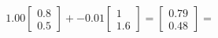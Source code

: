 \documentclass[preview]{standalone}
\begin{document}
\begin{align*}
1.00 \begin{bmatrix} 0.8 \\ 0.5 \end{bmatrix} + -0.01 \begin{bmatrix} 1 \\ 1.6 \end{bmatrix} = \begin{bmatrix} 0.79 \\ 0.48 \end{bmatrix} =
\end{align*}
\end{document}
